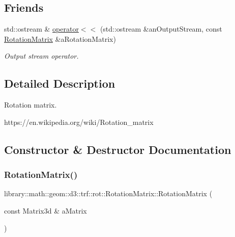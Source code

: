 \subsection*{Friends}
\begin{DoxyCompactItemize}
\item 
std\+::ostream \& \hyperlink{classlibrary_1_1math_1_1geom_1_1d3_1_1trf_1_1rot_1_1_rotation_matrix_aa9ed0897a6219331deeb7750017a0df9}{operator$<$$<$} (std\+::ostream \&an\+Output\+Stream, const \hyperlink{classlibrary_1_1math_1_1geom_1_1d3_1_1trf_1_1rot_1_1_rotation_matrix}{Rotation\+Matrix} \&a\+Rotation\+Matrix)
\begin{DoxyCompactList}\small\item\em Output stream operator. \end{DoxyCompactList}\end{DoxyCompactItemize}


\subsection{Detailed Description}
Rotation matrix. 

https\+://en.wikipedia.\+org/wiki/\+Rotation\+\_\+matrix 

\subsection{Constructor \& Destructor Documentation}
\mbox{\label{classlibrary_1_1math_1_1geom_1_1d3_1_1trf_1_1rot_1_1_rotation_matrix_a7f1184694020cb4f963d58931324ab06}} 
\subsubsection{\texorpdfstring{Rotation\+Matrix()}{RotationMatrix()}\hspace{0.1cm}{\footnotesize\ttfamily [1/2]}}
{\footnotesize\ttfamily library\+::math\+::geom\+::d3\+::trf\+::rot\+::\+Rotation\+Matrix\+::\+Rotation\+Matrix (\begin{DoxyParamCaption}\item[{const Matrix3d \&}]{a\+Matrix }\end{DoxyParamCaption})}



